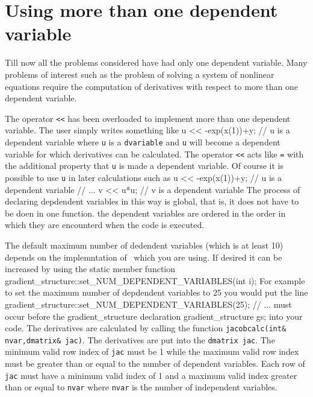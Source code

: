 \documentclass[12pt]{book}
\begin{document}
\section{Using more than one dependent variable}
Till now all the problems considered have had only one dependent 
variable. Many problems of interest such as the problem of
solving a system of nonlinear equations require the computation
of derivatives with respect to more than one dependent variable.  

The operator {\tt <<} has been overloaded to implement 
more than one dependent variable. The user simply writes
something like
\beginexample
u << -exp(x(1))+y; // u is a dependent variable
\endexample
where {\tt u} is a {\tt dvariable} and {\tt u} will become a
dependent variable for which  derivatives can be calculated.
The operator {\tt <<} acts like {\tt =} with the additional
property that {\tt u} is made a dependent variable.
Of course it is possible to use {\tt u} in later calculations
such as
\beginexample
u << -exp(x(1))+y; // u is a dependent variable
// ...
v << u*u; // v is a dependent variable
\endexample
The process of declaring depdendent variables in this way is
global, that is, it does not have to be doen in one function.
the dependent variables are ordered in the order in which they
are encounterd when the code is executed.

The default maximum number of dedendent variables (which is at least 10)
depends on the implemntation of \AD\ which you are using.
If desired it can be increased by using the static member function
\beginexample
gradient_structure::set_NUM_DEPENDENT_VARIABLES(int i);
\endexample
For example to set the maximum number of depdendent variables to 25
you would put the line 
\beginexample
gradient_structure::set_NUM_DEPENDENT_VARIABLES(25);
// ...  must occur before the gradient_structure declaration 
gradient_structure gs;
\endexample
\noindent into your code.
The  derivatives  are calculated by calling the function
\hbox{\tt jacobcalc(int\& nvar,dmatrix\& jac)}. The derivatives
are put into the {\tt dmatrix jac}. The minimum valid row index
of {\tt jac} must be 1 while the maximum valid row index must
be greater than or equal to the number of dependent variables.
Each row of {\tt jac} must have a minimum valid index of 1
and a maximum valid index greater than or equal to {\tt nvar}
where {\tt nvar} is the number of independent variables.
\end{document}

